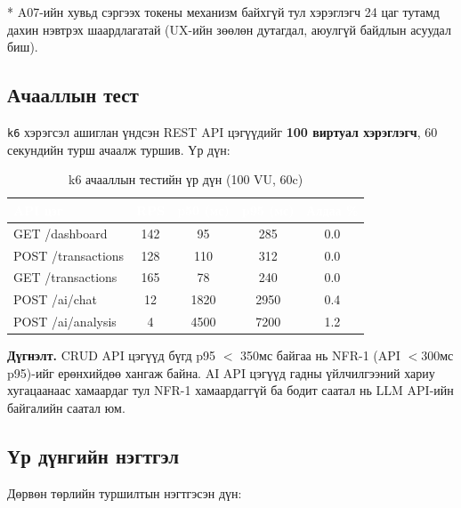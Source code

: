 * A07-ийн хувьд сэргээх токены механизм байхгүй тул хэрэглэгч 24 цаг тутамд дахин нэвтрэх шаардлагатай (UX-ийн зөөлөн дутагдал, аюулгүй байдлын асуудал биш).

\subsection{Ачааллын тест}
\texttt{k6} хэрэгсэл ашиглан үндсэн REST API цэгүүдийг \textbf{100 виртуал хэрэглэгч}, 60 секундийн турш ачаалж туршив. Үр дүн:

\begin{table}[ht]
\centering
\footnotesize
\renewcommand{\arraystretch}{1.25}
\begin{tabular}{|p{3.8cm}|c|c|c|c|}
\hline
\rowcolor{darknavy}
\textcolor{white}{\textbf{API цэг}} &
\textcolor{white}{\textbf{RPS}} &
\textcolor{white}{\textbf{p50 (мс)}} &
\textcolor{white}{\textbf{p95 (мс)}} &
\textcolor{white}{\textbf{Алдаа \%}} \\ \hline
GET /dashboard           & 142 & 95  & 285 & 0.0 \\ \hline
POST /transactions       & 128 & 110 & 312 & 0.0 \\ \hline
GET /transactions        & 165 & 78  & 240 & 0.0 \\ \hline
POST /ai/chat            & 12  & 1820 & 2950 & 0.4 \\ \hline
POST /ai/analysis        & 4   & 4500 & 7200 & 1.2 \\ \hline
\end{tabular}
\caption{k6 ачааллын тестийн үр дүн (100 VU, 60c)}
\label{tab:load-test}
\end{table}

\textbf{Дүгнэлт.} CRUD API цэгүүд бүгд p95 $<$ 350мс байгаа нь NFR-1 (API $<$300мс p95)-ийг ерөнхийдөө хангаж байна. AI API цэгүүд гадны үйлчилгээний хариу хугацаанаас хамаардаг тул NFR-1 хамаардаггүй ба бодит саатал нь LLM API-ийн байгалийн саатал юм.

\subsection{Үр дүнгийн нэгтгэл}
Дөрвөн төрлийн туршилтын нэгтгэсэн дүн:

